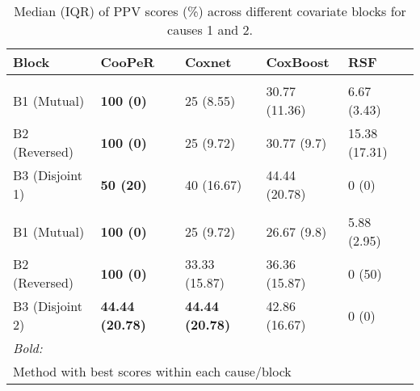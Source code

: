 \begin{table}
\centering
\caption{Median (IQR) of PPV scores (\%) across different covariate blocks for causes 1 and 2.\label{tab:ppv-median}}
\centering
\begin{tabular}[t]{lllll}
\toprule
Block & CooPeR & Coxnet & CoxBoost & RSF\\
\midrule
\addlinespace[0.3em]
\multicolumn{5}{l}{\textbf{Cause 1}}\\
\hspace{1em}B1 (Mutual) & \textbf{100 (0)} & 25 (8.55) & 30.77 (11.36) & 6.67 (3.43)\\
\hspace{1em}B2 (Reversed) & \textbf{100 (0)} & 25 (9.72) & 30.77 (9.7) & 15.38 (17.31)\\
\hspace{1em}B3 (Disjoint 1) & \textbf{50 (20)} & 40 (16.67) & 44.44 (20.78) & 0 (0)\\
\addlinespace[0.3em]
\multicolumn{5}{l}{\textbf{Cause 2}}\\
\hspace{1em}B1 (Mutual) & \textbf{100 (0)} & 25 (9.72) & 26.67 (9.8) & 5.88 (2.95)\\
\hspace{1em}B2 (Reversed) & \textbf{100 (0)} & 33.33 (15.87) & 36.36 (15.87) & 0 (50)\\
\hspace{1em}B3 (Disjoint 2) & \textbf{44.44 (20.78)} & \textbf{44.44 (20.78)} & 42.86 (16.67) & 0 (0)\\
\bottomrule
\multicolumn{5}{l}{\rule{0pt}{1em}\textit{Bold:}}\\
\multicolumn{5}{l}{\rule{0pt}{1em}Method with best scores within each cause/block}\\
\end{tabular}
\end{table}
